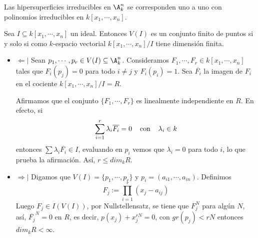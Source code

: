 \documentclass{article}
\begin{document}
\begin{cor}
    Las hipersuperficies irreducibles en $\A_{k}^{n}$ se corresponden uno a uno con polinomios
    irreducibles en $k[x_{1},\cdots,x_{n}]$.
\end{cor}

\begin{cor}
    Sea $I\subseteq k[x_{1},\cdots,x_{n}]$ un ideal. Entonces $V(I)$ es un conjunto finito de 
    puntos si y solo si como $k$-espacio vectorial $k[x_{1},\cdots,x_{n}]/I$ tiene dimensión finita.
\end{cor}

\begin{dem}\hspace{4mm}
    \begin{itemize}
        \item $\Leftarrow|$ Sean $p_{1},\cdots,p_{r}\in V(I)\subseteq\A_{k}^{n}$. Consideramos
        $F_{1},\cdots,F_{r}\in k[x_{1},\cdots,x_{n}]$ tales que $F_{i}(p_{j})=0$ para todo 
        $i\neq j$ y $F_{i}(p_{i})=1$. Sea $\overline{F_{i}}$ la imagen de $F_{i}$ en el cociente
        $k[x_{1},\cdots,x_{n}]/I=R$.
        \vspace{4mm}

        \noindent Afirmamos que el conjunto $\{F_{1},\cdots,F_{r}\}$ es linealmente independiente
        en $R$. En efecto, si
        \begin{equation*}
            \sum_{i=1}^{r}\lambda_{i}\overline{F_{i}}=0\hspace{4mm}\text{con}\hspace{4mm}
            \lambda_{i}\in k
        \end{equation*}
        entonces $\sum\lambda_{i}\overline{F_{i}}\in I$, evaluando en $p_{i}$ vemos que 
        $\lambda_{i}=0$ para todo $i$, lo que prueba la afirmación. Así, $r\leq dim_{k}R$.

        \item $\Rightarrow|$ Digamos que $V(I)=\{p_{1},\cdots,p_{r}\}$ y 
        $p_{i}=(a_{i1},\cdots,a_{in})$. Definimos
        \begin{equation*}
            F_{j}:=\prod_{i=1}^{r}(x_{j}-a_{ij})
        \end{equation*}
        Luego $F_{j}\in I(V(I))$, por Nullstellensatz, se tiene que $F_{j}^{N}$ para algún $N$,
        así, $\overline{F_{j}}^{N}=0$ en $R$, es decir, $p(x_{j})+x_{j}^{rN}=0$, con 
        $gr(p_{j})<rN$ entonces $dim_{k}R<\infty$.
    \end{itemize}
\end{dem}
\end{document}
